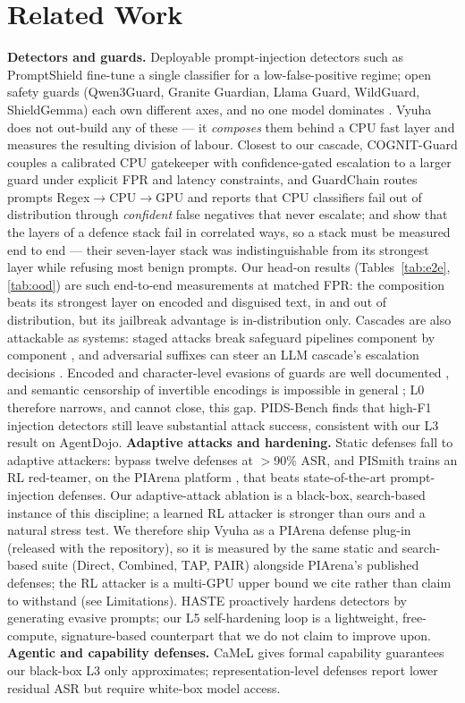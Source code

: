 \documentclass[11pt]{article}
\begin{document}
\section{Related Work}
\textbf{Detectors and guards.} Deployable prompt-injection detectors such as PromptShield
\citep{promptshield} fine-tune a single classifier for a low-false-positive regime; open safety guards
(Qwen3Guard, Granite Guardian, Llama Guard, WildGuard, ShieldGemma) each own different axes, and no one
model dominates \citep{guard-bench}. Vyuha does not out-build any of these --- it \emph{composes} them
behind a CPU fast layer and measures the resulting division of labour. Closest to our cascade,
COGNIT-Guard \citep{cognit} couples a calibrated CPU gatekeeper with confidence-gated escalation to a
larger guard under explicit FPR and latency constraints, and
GuardChain \citep{guardchain} routes prompts Regex$\rightarrow$CPU$\rightarrow$GPU and reports that CPU
classifiers fail out of distribution through \emph{confident} false negatives that never escalate; and
\citet{layered-ensemble} show that the layers of a defence stack fail in correlated ways, so a stack must
be measured end to end --- their seven-layer stack was indistinguishable from its strongest layer while
refusing most benign prompts. Our head-on results (Tables~\ref{tab:e2e}, \ref{tab:ood}) are such end-to-end measurements at matched
FPR: the composition beats its strongest layer on encoded and disguised text, in and out of
distribution, but its jailbreak advantage is in-distribution only.
Cascades are also attackable as systems: staged attacks break safeguard pipelines component by component
\citep{stack}, and adversarial suffixes can steer an LLM cascade's escalation decisions \citep{cascade-attack}.
Encoded and character-level evasions of guards are well documented \citep{hackett,emoji}, and semantic
censorship of invertible encodings is impossible in general \citep{glukhov}; L0 therefore narrows, and
cannot close, this gap. PIDS-Bench \citep{pidsbench} finds that high-F1 injection detectors still leave
substantial attack success, consistent with our L3 result on AgentDojo.
\textbf{Adaptive attacks and hardening.} Static defenses fall to adaptive attackers:
\citet{attacker-second} bypass twelve defenses at $>$90\% ASR, and PISmith \citep{pismith} trains an
RL red-teamer, on the PIArena platform \citep{piarena}, that beats state-of-the-art prompt-injection
defenses. Our adaptive-attack ablation is a black-box, search-based instance of this discipline; a
learned RL attacker is stronger than ours and a natural stress test. We therefore ship Vyuha as a
PIArena defense plug-in (released with the repository), so it is measured by the same static and search-based suite
(Direct, Combined, TAP, PAIR) alongside PIArena's published defenses; the RL attacker is a multi-GPU
upper bound we cite rather than claim to withstand (see Limitations). HASTE \citep{haste} proactively hardens detectors by generating
evasive prompts; our L5 self-hardening loop is a lightweight, free-compute, signature-based counterpart
that we do not claim to improve upon.
\textbf{Agentic and capability defenses.} CaMeL \citep{camel} gives formal capability guarantees our
black-box L3 only approximates; representation-level defenses report lower residual ASR but require
white-box model access.
\end{document}
